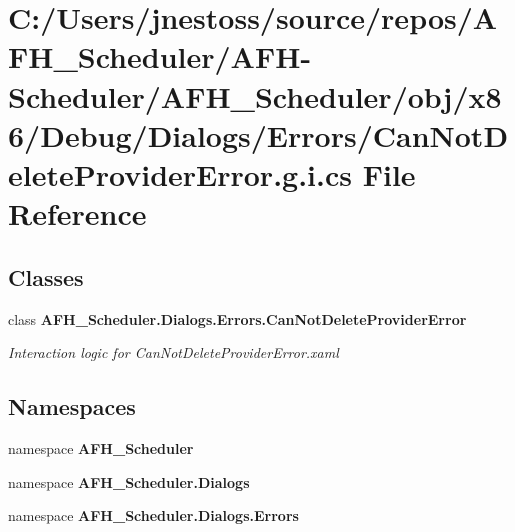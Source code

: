 \section{C\+:/\+Users/jnestoss/source/repos/\+A\+F\+H\+\_\+\+Scheduler/\+A\+F\+H-\/\+Scheduler/\+A\+F\+H\+\_\+\+Scheduler/obj/x86/\+Debug/\+Dialogs/\+Errors/\+Can\+Not\+Delete\+Provider\+Error.g.\+i.\+cs File Reference}
\label{x86_2_debug_2_dialogs_2_errors_2_can_not_delete_provider_error_8g_8i_8cs}
\subsection*{Classes}
\begin{DoxyCompactItemize}
\item 
class \textbf{ A\+F\+H\+\_\+\+Scheduler.\+Dialogs.\+Errors.\+Can\+Not\+Delete\+Provider\+Error}
\begin{DoxyCompactList}\small\item\em Interaction logic for Can\+Not\+Delete\+Provider\+Error.\+xaml \end{DoxyCompactList}\end{DoxyCompactItemize}
\subsection*{Namespaces}
\begin{DoxyCompactItemize}
\item 
namespace \textbf{ A\+F\+H\+\_\+\+Scheduler}
\item 
namespace \textbf{ A\+F\+H\+\_\+\+Scheduler.\+Dialogs}
\item 
namespace \textbf{ A\+F\+H\+\_\+\+Scheduler.\+Dialogs.\+Errors}
\end{DoxyCompactItemize}
